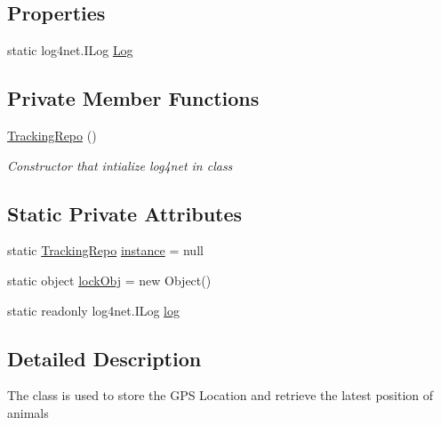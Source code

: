 \subsection*{Properties}
\begin{DoxyCompactItemize}
\item 
static log4net.\+I\+Log \hyperlink{classWildLifeTracker_1_1Repository_1_1TrackingRepo_a5fc9abb86e6110ecd61d0a1a7d740a8a}{Log}
\end{DoxyCompactItemize}
\subsection*{Private Member Functions}
\begin{DoxyCompactItemize}
\item 
\hyperlink{classWildLifeTracker_1_1Repository_1_1TrackingRepo_aabb3d9d19f75b36a5119cfb7275728c5}{Tracking\+Repo} ()
\begin{DoxyCompactList}\small\item\em Constructor that intialize log4net in class \end{DoxyCompactList}\end{DoxyCompactItemize}
\subsection*{Static Private Attributes}
\begin{DoxyCompactItemize}
\item 
static \hyperlink{classWildLifeTracker_1_1Repository_1_1TrackingRepo}{Tracking\+Repo} \hyperlink{classWildLifeTracker_1_1Repository_1_1TrackingRepo_ac0e711a270f857caad3532294a5bee6f}{instance} = null
\item 
static object \hyperlink{classWildLifeTracker_1_1Repository_1_1TrackingRepo_a38ff5bc3c19841e1e23deb0481c9816c}{lock\+Obj} = new Object()
\item 
static readonly log4net.\+I\+Log \hyperlink{classWildLifeTracker_1_1Repository_1_1TrackingRepo_ae6c6142b8525b2f4ac6ee6e003b3106f}{log}
\end{DoxyCompactItemize}


\subsection{Detailed Description}
The class is used to store the G\+PS Location and retrieve the latest position of animals 



